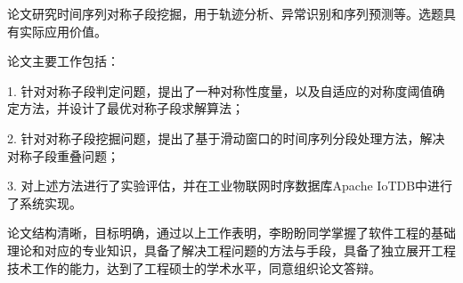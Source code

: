
\begin{comments}

论文研究时间序列对称子段挖掘，用于轨迹分析、异常识别和序列预测等。选题具有实际应用价值。 
  
论文主要工作包括：  
 
1. 针对对称子段判定问题，提出了一种对称性度量，以及自适应的对称度阈值确定方法，并设计了最优对称子段求解算法； 
 
2. 针对对称子段挖掘问题，提出了基于滑动窗口的时间序列分段处理方法，解决对称子段重叠问题； 
 
3. 对上述方法进行了实验评估，并在工业物联网时序数据库Apache IoTDB中进行了系统实现。 
 
论文结构清晰，目标明确，通过以上工作表明，李盼盼同学掌握了软件工程的基础理论和对应的专业知识，具备了解决工程问题的方法与手段，具备了独立展开工程技术工作的能力，达到了工程硕士的学术水平，同意组织论文答辩。

\end{comments}
